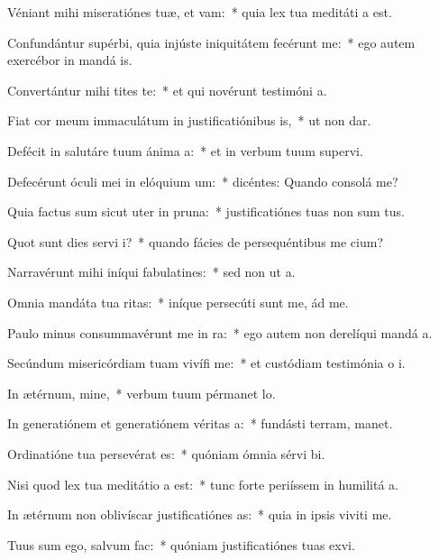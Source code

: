 \item Véniant mihi miseratiónes tuæ, et vam:~* quia lex tua meditáti a est.
\item Confundántur supérbi, quia injúste iniquitátem fecérunt  me:~* ego autem exercébor in mandá is.
\item Convertántur mihi tites te:~* et qui novérunt testimóni a.
\item Fiat cor meum immaculátum in justificatiónibus is,~* ut non dar.
\item Defécit in salutáre tuum ánima a:~* et in verbum tuum supervi.
\item Defecérunt óculi mei in elóquium um:~* dicéntes: Quando consolá me?
\item Quia factus sum sicut uter in pruna:~* justificatiónes tuas non sum tus.
\item Quot sunt dies servi i?~* quando fácies de persequéntibus me cium?
\item Narravérunt mihi iníqui fabulatines:~* sed non ut  a.
\item Omnia mandáta tua ritas:~* iníque persecúti sunt me, ád me.
\item Paulo minus consummavérunt me in ra:~* ego autem non derelíqui mandá a.
\item Secúndum misericórdiam tuam vivífi me:~* et custódiam testimónia o i.
\item In ætérnum, mine,~* verbum tuum pérmanet  lo.
\item In generatiónem et generatiónem véritas a:~* fundásti terram,  manet.
\item Ordinatióne tua persevérat es:~* quóniam ómnia sérvi bi.
\item Nisi quod lex tua meditátio a est:~* tunc forte periíssem in humilitá a.
\item In ætérnum non oblivíscar justificatiónes as:~* quia in ipsis viviti me.
\item Tuus sum ego, salvum  fac:~* quóniam justificatiónes tuas exvi.
